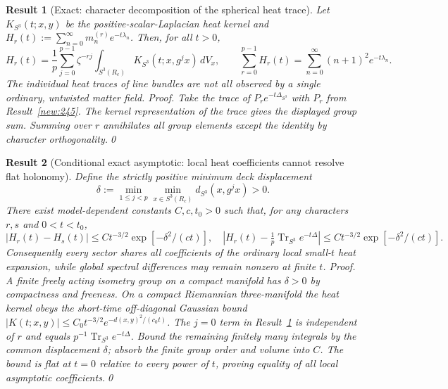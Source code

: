 \documentclass[aps,prd,onecolumn,notitlepage,groupedaddress,11pt]{revtex4-2}
\newtheorem{result}{Result}
\begin{document}
\begin{result}[\textsf{Exact}: character decomposition of the spherical heat trace]\label{new:248}
Let $K_{S^3}(t;x,y)$ be the positive-scalar-Laplacian heat kernel and $H_r(t):=\sum_{n=0}^{\infty}m_n^{(r)}e^{-t\lambda_n}$. Then, for all $t>0$,
\begin{equation}\label{eq:twisted248}
 H_r(t)=\frac1p\sum_{j=0}^{p-1}\zeta^{-rj}\int_{S^3(R_c)}K_{S^3}(t;x,g^jx)\,dV_x,
 \qquad \sum_{r=0}^{p-1}H_r(t)=\sum_{n=0}^{\infty}(n+1)^2e^{-t\lambda_n}.
\end{equation}
The individual heat traces of line bundles are not all observed by a single ordinary, untwisted matter field.
\textit{Proof.} Take the trace of $P_r e^{-t\Delta_{S^3}}$ with $P_r$ from Result~\ref{new:245}. The kernel representation of the trace gives the displayed group sum. Summing over $r$ annihilates all group elements except the identity by character orthogonality.\qed
\end{result}

\begin{result}[\textsf{Conditional exact asymptotic}: local heat coefficients cannot resolve flat holonomy]\label{new:249}
Define the strictly positive minimum deck displacement
\begin{equation}\label{eq:twisted249}
 \delta:=\min_{1\le j<p}\min_{x\in S^3(R_c)}d_{S^3}(x,g^jx)>0.
\end{equation}
There exist model-dependent constants $C,c,t_0>0$ such that, for any characters $r,s$ and $0<t<t_0$,
\begin{equation}\label{eq:twisted249b}
 |H_r(t)-H_s(t)|\le C t^{-3/2}\exp[-\delta^2/(ct)],\quad
 \left|H_r(t)-\tfrac1p\operatorname{Tr}_{S^3}e^{-t\Delta}\right|\le C t^{-3/2}\exp[-\delta^2/(ct)].
\end{equation}
Consequently every sector shares all coefficients of the ordinary \emph{local} small-$t$ heat expansion, while global spectral differences may remain nonzero at finite $t$.
\textit{Proof.} A finite freely acting isometry group on a compact manifold has $\delta>0$ by compactness and freeness. On a compact Riemannian three-manifold the heat kernel obeys the short-time off-diagonal Gaussian bound $|K(t;x,y)|\le C_0t^{-3/2}e^{-d(x,y)^2/(c_0t)}$. The $j=0$ term in Result~\ref{new:248} is independent of $r$ and equals $p^{-1}\operatorname{Tr}_{S^3}e^{-t\Delta}$. Bound the remaining finitely many integrals by the common displacement $\delta$; absorb the finite group order and volume into $C$. The bound is flat at $t=0$ relative to every power of $t$, proving equality of all local asymptotic coefficients.\qed
\end{result}
\end{document}
